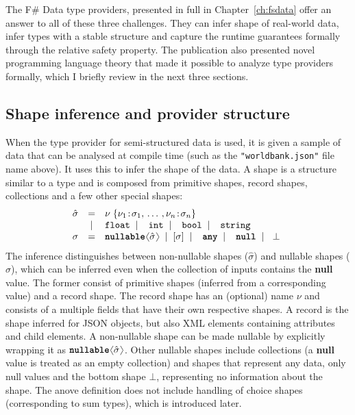 \documentclass[fleqn,11pt]{report}
\newcommand{\lsep}[0]{\;\; | \;\;}
\newcommand{\kvd}[1]{\textnormal{\ttfamily\bfseries #1}}
\newcommand{\ident}[1]{\textnormal{\ttfamily #1}}
\newcommand{\langl}{\begin{picture}(4.5,7)
\put(1.1,2.5){\rotatebox{60}{\line(1,0){5.5}}}
\put(1.1,2.5){\rotatebox{300}{\line(1,0){5.5}}}
\end{picture}}
\newcommand{\rangl}{\begin{picture}(4.5,7)
\put(.9,2.5){\rotatebox{120}{\line(1,0){5.5}}}
\put(.9,2.5){\rotatebox{240}{\line(1,0){5.5}}}
\end{picture}}
\theoremstyle{definition}
\begin{document}
The F\# Data type providers, presented in full in Chapter~\ref{ch:fsdata} offer an answer to
all of these three challenges. They can infer shape of real-world data, infer types with a stable
structure and capture the runtime guarantees formally through the relative safety property. The
publication also presented novel programming language theory that made it possible to analyze type
providers formally, which I briefly review in the next three sections.

\subsection{Shape inference and provider structure}
When the type provider for semi-structured data is used, it is given a sample of data that
can be analysed at compile time (such as the \texttt{"worldbank.json"} file name above). It
uses this to infer the shape of the data. A shape is a structure similar to a type and is
composed from primitive shapes, record shapes, collections and a few other special shapes:
%
\begin{equation*}
\begin{array}{rcl}
 \hat{\sigma} &=& \nu \; \{ \nu_1 \!:\! \sigma_1, \,\ldots\,, \nu_n \!:\! \sigma_n \}\\
                &|& \ident{float} \lsep \ident{int} \lsep \ident{bool} \lsep \ident{string}\\
       \sigma &=& \kvd{nullable}\langl \hat{\sigma} \rangl \lsep [\sigma] \lsep \kvd{any} \lsep \kvd{null}  \lsep ~\bot~
\end{array}
\end{equation*}
%
The inference distinguishes between non-nullable shapes ($\hat{\sigma}$) and nullable shapes
($\sigma$), which can be inferred even when the collection of inputs contains the \kvd{null}
value. The former consist of primitive shapes (inferred from a corresponding value) and
a record shape. The record shape has an (optional) name $\nu$ and consists of a multiple fields
that have their own respective shapes. A record is the shape inferred for JSON objects, but also
XML elements containing attributes and child elements. A non-nullable shape can be made nullable
by explicitly wrapping it as $\kvd{nullable}\langl \hat{\sigma} \rangl$. Other nullable shapes
include collections (a \kvd{null} value is treated as an empty collection) and shapes that represent
any data, only null values and the bottom shape $\bot$, representing no information about the shape.
The anove definition does not include handling of choice shapes (corresponding to sum types), which
is introduced later.
\end{document}
